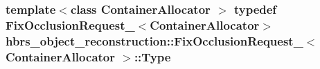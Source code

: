 \hypertarget{structhbrs__object__reconstruction_1_1_fix_occlusion_request___a02fb01d00547db859af176c095556051}{
\subsubsection[{\-Type}]{\setlength{\rightskip}{0pt plus 5cm}template$<$class Container\-Allocator $>$ typedef {\bf \-Fix\-Occlusion\-Request\-\_\-}$<$\-Container\-Allocator$>$ {\bf hbrs\-\_\-object\-\_\-reconstruction\-::\-Fix\-Occlusion\-Request\-\_\-}$<$ \-Container\-Allocator $>$\-::{\bf \-Type}}}\label{structhbrs__object__reconstruction_1_1_fix_occlusion_request___a02fb01d00547db859af176c095556051}


